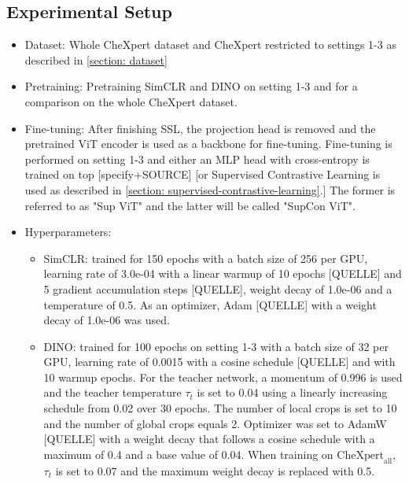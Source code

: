 \subsection{Experimental Setup}
\begin{itemize}
	\item Dataset: Whole CheXpert dataset \citep{Irvin2019} and CheXpert restricted to settings 1-3 as described in \ref{section: dataset}\\
	\item Pretraining: Pretraining SimCLR and DINO on setting 1-3 and for a comparison on the whole CheXpert dataset.\\ 
	\item Fine-tuning: After finishing SSL, the projection head is removed and the pretrained ViT encoder is used as a backbone for fine-tuning.
	Fine-tuning is performed on setting 1-3 and either an MLP head with cross-entropy is trained on top [specify+SOURCE] [or Supervised Contrastive Learning is used as described in \ref{section: supervised-contrastive-learning}.]
	The former is referred to as "Sup ViT" and the latter will be called "SupCon ViT".\\
	\item Hyperparameters: 
		\begin{itemize}
			\item SimCLR: trained for 150 epochs with a batch size of 256 per GPU, learning rate of 3.0e-04 with a linear warmup of 10 epochs [QUELLE] and 5 gradient accumulation steps [QUELLE], weight decay of 1.0e-06 and a temperature of 0.5. 
			As an optimizer, Adam [QUELLE] with a weight decay of 1.0e-06 was used.
		\end{itemize}
		\begin{itemize}
			\item DINO: trained for 100 epochs on setting 1-3 with a batch size of 32 per GPU, learning rate of 0.0015 with a cosine schedule [QUELLE] and with 10 warmup epochs.
			For the teacher network, a momentum of 0.996 is used and the teacher temperature $\tau_t$ is set to 0.04 using a linearly increasing schedule from 0.02 over 30 epochs.
			The number of local crops is set to 10 and the number of global crops equals 2. 
			Optimizer was set to AdamW [QUELLE] with a weight decay that follows a cosine schedule with a maximum of 0.4 and a base value of 0.04.
			When training on $\text{CheXpert}_\text{all}$, $\tau_t$ is set to 0.07 and the maximum weight decay is replaced with 0.5.
		\end{itemize}

\end{itemize}
